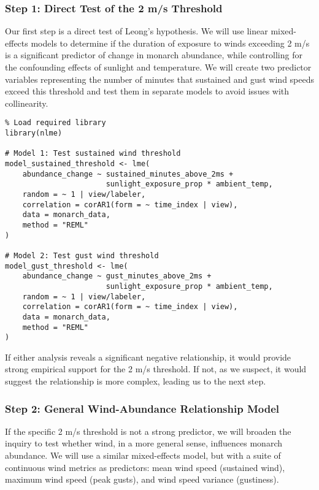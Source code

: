 \subsubsection{Step 1: Direct Test of the 2 m/s Threshold}

Our first step is a direct test of Leong's hypothesis. We will use linear mixed-effects models to determine if the duration of exposure to winds exceeding 2 m/s is a significant predictor of change in monarch abundance, while controlling for the confounding effects of sunlight and temperature. We will create two predictor variables representing the number of minutes that sustained and gust wind speeds exceed this threshold and test them in separate models to avoid issues with collinearity.

\begin{verbatim}
% Load required library
library(nlme)

# Model 1: Test sustained wind threshold
model_sustained_threshold <- lme(
    abundance_change ~ sustained_minutes_above_2ms + 
                       sunlight_exposure_prop * ambient_temp,
    random = ~ 1 | view/labeler,
    correlation = corAR1(form = ~ time_index | view),
    data = monarch_data,
    method = "REML"
)

# Model 2: Test gust wind threshold
model_gust_threshold <- lme(
    abundance_change ~ gust_minutes_above_2ms + 
                       sunlight_exposure_prop * ambient_temp,
    random = ~ 1 | view/labeler,
    correlation = corAR1(form = ~ time_index | view),
    data = monarch_data,
    method = "REML"
)
\end{verbatim}

If either analysis reveals a significant negative relationship, it would provide strong empirical support for the 2 m/s threshold. If not, as we suspect, it would suggest the relationship is more complex, leading us to the next step.

\subsubsection{Step 2: General Wind-Abundance Relationship Model}

If the specific 2 m/s threshold is not a strong predictor, we will broaden the inquiry to test whether wind, in a more general sense, influences monarch abundance. We will use a similar mixed-effects model, but with a suite of continuous wind metrics as predictors: mean wind speed (sustained wind), maximum wind speed (peak gusts), and wind speed variance (gustiness).

